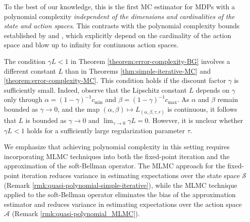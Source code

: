 \documentclass[11pt]{article}
\numberwithin{equation}{section}
\theoremstyle{definition}
\theoremstyle{remark}
\newcommand{\citet}{\cite}
\begin{document}
 


 To the best of our knowledge, this is the first MC estimator for MDPs with a polynomial complexity \emph{independent of the 
 dimensions and 
 cardinalities of the state and action spaces}.  
This contrasts with the polynomial complexity bounds established by \citet{grill2019planning} and \citet{beck2023nonlinearmontecarlomethods}, which explicitly depend on the cardinality of the action space and blow  up to infinity for continuous action spaces.



The condition $\gamma L < 1$ in Theorem \ref{theorem:error-complexity-BG} involves a different constant $L$ than in Theorems \ref{thm:simple-iterative-MC} and \ref{theorem:error-complexity-MC}.
This condition  holds if the discount factor $\gamma$ is sufficiently small. Indeed, observe that   the Lipschitz constant $ L $ depends on $ \gamma $ only through $ \alpha = (1 - \gamma)^{-1}c_{\min} $ and $ \beta = (1 - \gamma)^{-1}c_{\max} $. As $ \alpha $ and $ \beta $ remain bounded as $ \gamma \to 0 $, and the map  $ (\alpha, \beta) \mapsto L_{(\alpha,\beta, \tau ,r)} $ is continuous, it follows that $ L $ is bounded as $ \gamma \to 0 $ and  $\lim_{\gamma\to 0} \gamma L = 0 $.
However, it is
unclear whether $\gamma L < 1$
holds for a sufficiently large regularization parameter $\tau$.  



We emphasize that achieving polynomial complexity in this setting requires incorporating   MLMC techniques into both the fixed-point iteration and the approximation of the soft-Bellman operator.  
The MLMC approach for the fixed-point iteration reduces variance in estimating expectations over the state space $  \mathcal{S}$ (Remark \ref{rmk:quasi-polynomial-simple-iterative}),
while   the MLMC technique applied to the soft-Bellman operator eliminates the bias of the approximation estimator and reduces variance in estimating expectations over the action space  $\mathcal{A}$ (Remark \ref{rmk:quasi-polynomial_MLMC}).


 
\end{document}
